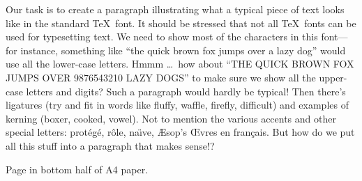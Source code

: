 
\rm
Our task is to create a paragraph illustrating what a typical piece of text
looks like in the standard \TeX\ font.  It should be stressed that not all
\TeX\ fonts can be used for typesetting text.  We need to show most of the
characters in this font---for instance, something like ``the quick brown fox
jumps over a lazy dog'' would use all the lower-case letters.  Hmmm \dots\
how about ``THE QUICK BROWN FOX JUMPS OVER 9876543210 LAZY DOGS'' to make
sure we show all the upper-case letters and digits?  Such a paragraph would
hardly be typical!  Then there's ligatures (try and fit in words like
fluffy, waffle, firefly, difficult) and examples of kerning (boxer, cooked,
vowel).  Not to mention the various accents and other special letters:
prot\'eg\'e, r\^ole, na\"\i ve, \AE sop's \OE vres en fran\c cais.
But how do we put all this stuff into a paragraph that makes sense!?
\vfil\eject


\null\vfil
\centerline{Page in bottom half of A4 paper.}
\eject


\voffset -3in
\hoffset -9in
\vfil\eject


\voffset 3in
\hoffset 9in
\null\vfil
{}
\eject


\voffset -3in
\hoffset -3in
\vsize 15in
\hsize 15in
\vfil
{}
\eject
\voffset 0in \hoffset 0in       %

\bye
